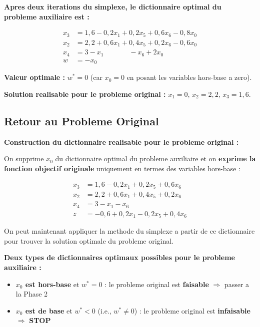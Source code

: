 \documentclass[12pt,a4paper]{article}
\begin{document}
\begin{methode}
\textbf{Apres deux iterations du simplexe, le dictionnaire optimal du probleme auxiliaire est :}

\begin{align*}
x_3 &= 1{,}6 - 0{,}2x_1 + 0{,}2x_5 + 0{,}6x_6 - 0{,}8x_0\\
x_2 &= 2{,}2 + 0{,}6x_1 + 0{,}4x_5 + 0{,}2x_6 - 0{,}6x_0\\
x_4 &= 3 - x_1 \phantom{{}+ 0{,}4x_5} - x_6 + 2x_0\\
w &= -x_0
\end{align*}

\textbf{Valeur optimale :} $w^* = 0$ (car $x_0 = 0$ en posant les variables hors-base a zero).

\textbf{Solution realisable pour le probleme original :} $x_1 = 0$, $x_2 = 2{,}2$, $x_3 = 1{,}6$.
\end{methode}

\newpage
\subsection{Retour au Probleme Original}

\begin{methode}
\textbf{Construction du dictionnaire realisable pour le probleme original :}

On supprime $x_0$ du dictionnaire optimal du probleme auxiliaire et on \textcolor{defvert}{\textbf{exprime la fonction objectif originale}} uniquement en termes des variables hors-base :

\begin{align*}
x_3 &= 1{,}6 - 0{,}2x_1 + 0{,}2x_5 + 0{,}6x_6\\
x_2 &= 2{,}2 + 0{,}6x_1 + 0{,}4x_5 + 0{,}2x_6\\
x_4 &= 3 - x_1 - x_6\\
z &= -0{,}6 + 0{,}2x_1 - 0{,}2x_5 + 0{,}4x_6
\end{align*}

On peut maintenant appliquer la methode du simplexe a partir de ce dictionnaire pour trouver la solution optimale du probleme original.
\end{methode}

\begin{important}
\textbf{Deux types de dictionnaires optimaux possibles pour le probleme auxiliaire :}

\begin{itemize}
    \item \textcolor{defvert}{\textbf{$x_0$ est hors-base}} et $w^* = 0$ : le probleme original est \textcolor{defvert}{\textbf{faisable}} $\Rightarrow$ passer a la Phase 2
    \item \textcolor{importantrouge}{\textbf{$x_0$ est de base}} et $w^* < 0$ (i.e., $w^* \neq 0$) : le probleme original est \textcolor{importantrouge}{\textbf{infaisable}} $\Rightarrow$ \textbf{STOP}
\end{itemize}
\end{important}
\end{document}
